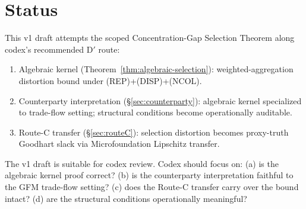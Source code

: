 \documentclass{article}
\begin{document}
\section{Status}

This v1 draft attempts the scoped Concentration-Gap Selection
Theorem along codex's recommended D$'$ route:
\begin{enumerate}
\item Algebraic kernel (Theorem~\ref{thm:algebraic-selection}):
  weighted-aggregation distortion bound under (REP)+(DISP)+(NCOL).
\item Counterparty interpretation (\S\ref{sec:counterparty}):
  algebraic kernel specialized to trade-flow setting; structural
  conditions become operationally auditable.
\item Route-C transfer (\S\ref{sec:routeC}): selection distortion
  becomes proxy-truth Goodhart slack via Microfoundation
  Lipschitz transfer.
\end{enumerate}

The v1 draft is suitable for codex review.  Codex should focus
on: (a) is the algebraic kernel proof correct?  (b) is the
counterparty interpretation faithful to the GFM trade-flow
setting?  (c) does the Route-C transfer carry over the bound
intact?  (d) are the structural conditions operationally
meaningful?
\end{document}
